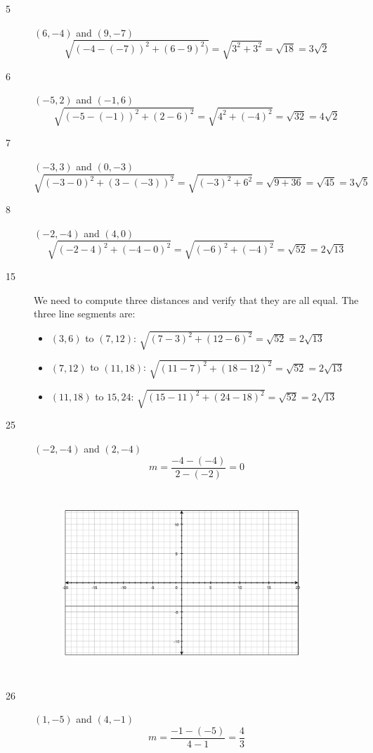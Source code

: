 \documentclass[fleqn,addpoints]{exam}
\begin{document}
\begin{description}
\item[5]
$(6, -4)$ and $(9, -7)$
\[
  \sqrt{(-4 - (-7))^2 + (6-9)^2)} = \sqrt{3^2 + 3^2} = \sqrt{18} = 3\sqrt{2}
\]

\item[6]
$(-5, 2)$ and $(-1, 6)$
\[
  \sqrt{(-5 - (-1))^2 + (2-6)^2} = \sqrt{4^2 + (-4)^2} = \sqrt{32} = 4 \sqrt{2}
\]

\item[7]
$(-3, 3)$ and $(0, -3)$
\[
  \sqrt{(-3-0)^2 + (3 - (-3))^2} = \sqrt{(-3)^2 + 6^2} = \sqrt{9 + 36} = \sqrt{45} = 3\sqrt{5}
\]

\item[8]
$(-2, -4)$ and $(4, 0)$
\[
  \sqrt{(-2 - 4)^2 + (-4 - 0)^2} = \sqrt{(-6)^2 + (-4)^2} = \sqrt{52} = 2 \sqrt{13}
\]

\item[15]
We need to compute three distances and verify that they are all equal.  The three line segments are:
\begin{itemize}
  \item $(3, 6)$ to $(7, 12)$: $\sqrt{(7-3)^2 + (12-6)^2} = \sqrt{52} = 2 \sqrt{13}$
  \item $(7, 12)$ to $(11, 18)$: $\sqrt{(11-7)^2 + (18-12)^2} = \sqrt{52} = 2 \sqrt{13}$
  \item $(11, 18)$ to $15, 24$:  $\sqrt{(15-11)^2 + (24-18)^2} = \sqrt{52} = 2 \sqrt{13}$
\end{itemize}

\item[25]
$(-2, -4)$ and $(2, -4)$
\[
  m = \frac{-4 - (-4)}{2 - (-2)} = 0
\]

\begin{figure}[H]
  \includegraphics[width=9cm,height=7cm]{p374/25}
\end{figure}

\item[26]
$(1, -5)$ and $(4, -1)$
\[
  m = \frac{-1 - (-5)}{4 - 1} = \frac{4}{3}
\]


\end{description}
\end{document}
